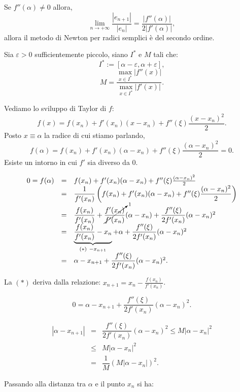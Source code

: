 \begin{prop}
Se $f''(\alpha) \neq 0$ allora,
\[
\lim_{n \to +\infty}\frac{|e_{n+1}|}{|e_n|}= \frac{|f''(\alpha)|}{2|f'(\alpha)|},
\]
allora il metodo di Newton per radici semplici è del secondo ordine.
\end{prop}
\begin{dimo}
Sia $\varepsilon > 0$ sufficientemente piccolo, siano $I^*$ e $M$ tali che:
\[I^* := [\alpha-\varepsilon, \alpha + \varepsilon],\]
\[M = \frac{\max_{x \in I^*}|f''(x)|}{\max_{x \in I^*}|f'(x)|}.\]

Vediamo lo sviluppo di Taylor di $f$:
\[
f(x) = f(x_n) + f'(x_n)(x-x_n) + f''(\xi)\frac{(x-x_n)^2}{2}.
\]
Posto $x \equiv \alpha$ la radice di cui stiamo parlando,
\[
f(\alpha) = f(x_n) + f'(x_n)(\alpha-x_n) + f''(\xi)\frac{(\alpha-x_n)^2}{2}
= 0.
\]
Esiste un intorno in cui $f'$ sia diverso da $0$.

\[
\begin{array}{lcl}
0 = f(\alpha) 
     & = & f(x_n) + f'(x_n)(\alpha-x_n) + 
           f''(\xi)\frac{(\alpha-x_n)^2}{2}\\
     & = & \dfrac{1}{f'(x_n)}\left(f(x_n) + f'(x_n)(\alpha-x_n) + f''(\xi)
           \dfrac{(\alpha-x_n)^2}{2}\right) \\
     & = & \dfrac{f(x_n)}{f'(x_n)} + \cancelto{1}{\dfrac{f'(x_n)}{f'(x_n)}}
           (\alpha-x_n)+\dfrac{f''(\xi)}{2f'(x_n)}(\alpha-x_n)^2\\
     & = & \underbrace{\dfrac{f(x_n)}{f'(x_n)} - x_n}_{(*) \ -x_{n+1}} + \alpha + 
           \dfrac{f''(\xi)}{2f'(x_n)}(\alpha-x_n)^2\\
     & = & \alpha -x_{n+1} + \dfrac{f''(\xi)}{2f'(x_n)}(\alpha-x_n)^2.
\end{array}
\]

La $(*)$ deriva dalla relazione: $x_{n+1} = x_n - \frac{f(x_n)}{f'(x_n)}$.

\[
0 = \alpha - x_{n+1} + \frac{f''(\xi)}{2f'(x_n)}(\alpha-x_n)^2.
\]

\[\begin{array}{lcl}
|\alpha - x_{n+1}| & = & \dfrac{f''(\xi)}{2f'(x_n)}(\alpha-x_n)^2 
                        \leq M|\alpha -x_n|^2\\ 
                  & \leq & M|\alpha -x_n|^2 \\
                  & = & \dfrac{1}{M}(M|\alpha -x_n|)^2.
\end{array}
\]

Passando alla distanza tra $\alpha$ e il punto $x_n$ si ha:


\end{dimo}
